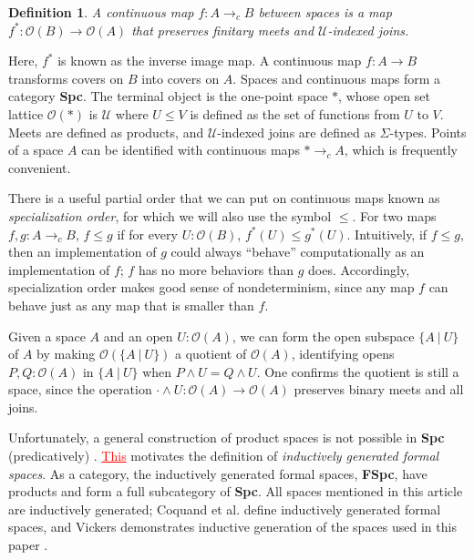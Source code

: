 \documentclass[conference]{IEEEtran}
\newtheorem{definition}{Definition}
\newcommand{\cto}{\to_c}
\newcommand{\Type}{\mathcal{U}}
\newcommand{\suchthat}{\ |\ }
\newcommand{\One}{\ast}
\newcommand{\Open}[1]{\mathcal{O}({#1})}
\newcommand{\iimg}[1]{{#1}^*}
\newcommand{\grammar}[1]{\textcolor{red}{\underline{#1}}}
\begin{document}
\begin{definition}
A \emph{continuous map} $f : A \cto B$ between spaces is a map $\iimg{f} : \Open{B} \to \Open{A}$ that preserves finitary meets and $\Type$-indexed joins.
\end{definition}

Here, $\iimg{f}$ is known as the inverse image map. A continuous map $f : A \to B$ transforms covers on $B$ into covers on $A$. Spaces and continuous maps form a category \textbf{Spc}. The terminal object is the one-point space $\One$, whose open set lattice $\Open{\One}$ is $\Type$ where $U \le V$ is defined as the set of functions from $U$ to $V$. Meets are defined as products, and $\Type$-indexed joins are defined as $\Sigma$-types. Points of a space $A$ can be identified with continuous maps $\One \cto A$, which is frequently convenient.

There is a useful partial order that we can put on continuous maps known as \emph{specialization order}, for which we will also use the symbol $\le$. For two maps $f, g : A \cto B$, $f \le g$ if for every $U : \Open{B}$, $\iimg{f}(U) \le \iimg{g}(U)$. Intuitively, if $f \le g$, then an implementation of $g$ could always ``behave'' computationally as an implementation of $f$; $f$ has no more behaviors than $g$ does. Accordingly, specialization order makes good sense of nondeterminism, since any map $f$ can behave just as any map that is smaller than $f$.

Given a space $A$ and an open $U : \Open{A}$, we can form the open subspace $\{ A \suchthat U \}$ of $A$ by making $\Open{\{A \suchthat U \}}$ a quotient of $\Open{A}$, identifying opens $P, Q : \Open{A}$ in $\{ A \suchthat U \}$ when $P \wedge U = Q \wedge U$. One confirms the quotient is still a space, since the operation $\cdot \wedge U : \Open{A} \to \Open{A}$ preserves binary meets and all joins.

Unfortunately, a general construction of product spaces is not possible in \textbf{Spc} (predicatively) \cite{coquand2003}. \grammar{This} motivates the definition of \emph{inductively generated formal spaces}. As a category, the inductively generated formal spaces, \textbf{FSpc}, have products and form a full subcategory of \textbf{Spc}. All spaces mentioned in this article are inductively generated; Coquand et al. \cite{coquand2003} define inductively generated formal spaces, and Vickers demonstrates inductive generation of the spaces used in this paper \cite{vickersmetric, vickersdoublepowerlocale, SublocFT, vickersconnected}.
\end{document}
